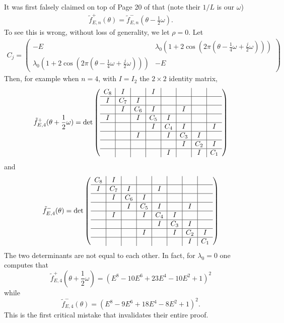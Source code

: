 \documentclass[11pt]{amsart}
\begin{document}
It was first falsely claimed on top of Page 20 of \cite{BGW} that (note their $1/L$ is our $\omega$)
\begin{align}\label{eq:wrong_1}
    \tilde{f}_{E,n}^+(\theta)=\tilde{f}_{E,n}^-(\theta-\frac{1}{2}\omega).
\end{align} 
To see this is wrong, without loss of generality, we let $\rho=0$.
Let 
\begin{align}
    C_j=\left(\begin{matrix}
        -E &\lambda_0(1+2\cos(2\pi(\theta-\frac{1}{4}\omega+\frac{j}{2}\omega)))\\ \lambda_0(1+2\cos(2\pi(\theta-\frac{1}{4}\omega+\frac{j}{2}\omega))) &-E
    \end{matrix}\right)
\end{align}
Then, for example when $n=4$, with $I=I_2$ the $2\times 2$ identity matrix,
\begin{align}
    \tilde{f}_{E,4}^+(\theta+\frac{1}{2}\omega)=\det
    \left(\begin{array}{c|c|c|c|c|c|c|c}
    C_8 &I & & I & & & &\\
    \hline
    I &C_7 &I & & & & &\\
    \hline
      &I &C_6 &I & &I & &\\
      \hline
    I & &I &C_5 &I & & &\\
    \hline
      & & &I &C_4 &I & &I\\
      \hline
      & &I & &I &C_3 &I &\\
      \hline
      & & & & &I &C_2 &I\\ 
      \hline
      & & & &I & &I  &C_1
    \end{array}\right)
\end{align}
and 
\begin{align}
    \tilde{f}_{E,4}^-(\theta)=
    \det
    \left(\begin{array}{c|c|c|c|c|c|c|c}
    C_8 &I & & & & & &\\
    \hline
    I &C_7 &I & & I & & & \\
    \hline
    &I &C_6 &I & & & & \\
    \hline
    &  &I &C_5 &I & &I & \\
      \hline
    &I & &I &C_4 &I & & \\
    \hline
    &  & & &I &C_3 &I & \\
      \hline
    &  & &I & &I &C_2 &I \\
      \hline
    &  & & & & &I &C_1 \\ 
    \end{array}\right)
\end{align}
The two determinants are not equal to each other. In fact, for  $\lambda_0=0$ one computes that 
\[
 \tilde{f}_{E,4}^+(\theta+\frac{1}{2}\omega) = (E^{8} - 10E^{6} + 23E^4 - 10E^2 + 1)^2
\]
while 
\[
  \tilde{f}_{E,4}^-(\theta) = (E^{8} - 9E^{6} + 18E^4- 8E^2 + 1)^2.
\]
This is the first critical mistake that invalidates their entire proof.
\end{document}
